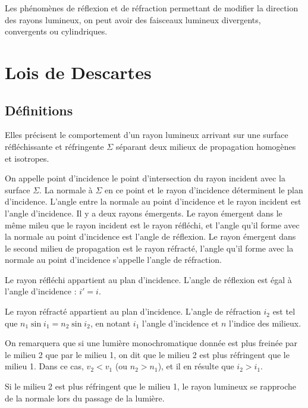 Les phénomènes de réflexion et de réfraction permettant de modifier la direction des rayons lumineux, on peut avoir des faisceaux lumineux divergents, convergents ou cylindriques.

\section{Lois de Descartes}
\label{chap6-sec:LoisdeSnellDescartes}

\subsection{Définitions}
\label{chap6-subsec:définitions}

Elles précisent le comportement d'un rayon lumineux arrivant sur une surface réfléchissante et réfringente $\Sigma$ séparant deux milieux de propagation homogènes et isotropes.

On appelle point d'incidence le point d'intersection du rayon incident avec la surface $\Sigma$. La normale à $\Sigma$ en ce point et le rayon d'incidence déterminent le plan d'incidence. L'angle entre la normale au point d'incidence et le rayon incident est l'angle d'incidence. Il y a deux rayons émergents. Le rayon émergent dans le même mileu que le rayon incident est le rayon réfléchi, et l'angle qu'il forme avec la normale au point d'incidence est l'angle de réflexion. Le rayon émergent dans le second milieu de propagation est le rayon réfracté, l'angle qu'il forme avec la normale au point d'incidence s'appelle l'angle de réfraction.

\begin{theo}
  Le rayon réfléchi appartient au plan d'incidence. L'angle de réflexion est égal à l'angle d'incidence : $i'=i$.
\end{theo}
\begin{theo}
  Le rayon réfracté appartient au plan d'incidence. L'angle de réfraction $i_2$ est tel que $n_1 \sin i_1 = n_2 \sin i_2$, en notant $i_1$ l'angle d'incidence et $n$ l'indice des milieux.
\end{theo}

On remarquera que si une lumière monochromatique donnée est plus freinée par le milieu 2 que par le milieu 1, on dit que le milieu 2 est plus réfringent que le milieu 1. Dans ce cas, $v_2 < v_1$ (ou $n_2 > n_1$), et il en résulte que $i_2 > i_1$.

Si le milieu 2 est plus réfringent que le milieu 1, le rayon lumineux se rapproche de la normale lors du passage de la lumière.

